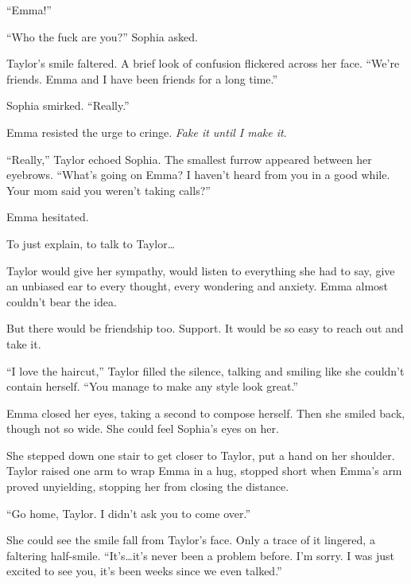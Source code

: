 ``Emma!''



``Who the fuck are you?'' Sophia asked.



Taylor's smile faltered.  A brief look of confusion flickered across her face.  ``We're friends.  Emma and I have been friends for a long time.''



Sophia smirked.  ``Really.''



Emma resisted the urge to cringe.  \emph{Fake it until I make it}.



``Really,'' Taylor echoed Sophia.  The smallest furrow appeared between her eyebrows.  ``What's going on Emma?  I haven't heard from you in a good while.  Your mom said you weren't taking calls?''



Emma hesitated.



To just explain, to talk to Taylor\ldots



Taylor would give her sympathy, would listen to everything she had to say, give an unbiased ear to every thought, every wondering and anxiety.  Emma almost couldn't bear the idea.



But there would be friendship too.  Support.  It would be so easy to reach out and take it.



``I love the haircut,'' Taylor filled the silence, talking and smiling like she couldn't contain herself.  ``You manage to make any style look great.''



Emma closed her eyes, taking a second to compose herself.  Then she smiled back, though not so wide.  She could feel Sophia's eyes on her.



She stepped down one stair to get closer to Taylor, put a hand on her shoulder.  Taylor raised one arm to wrap Emma in a hug, stopped short when Emma's arm proved unyielding, stopping her from closing the distance.



``Go home, Taylor.  I didn't ask you to come over.''



She could see the smile fall from Taylor's face.  Only a trace of it lingered, a faltering half-smile.  ``It's\ldots it's never been a problem before.  I'm sorry.  I was just excited to see you, it's been weeks since we even talked.''



